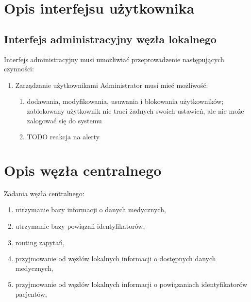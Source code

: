 \documentclass[a4paper]{report}
\begin{document}
\section{Opis interfejsu użytkownika}


\subsection{Interfejs administracyjny węzła lokalnego}

Interfejs administracyjny musi umożliwiać przeprowadzenie następujących czynności:
\begin{enumerate}
  \item Zarządzanie użytkownikami
        Administrator musi mieć możliwość:
        \begin{enumerate}
          \item dodawania, modyfikowania, usuwania i blokowania użytkowników; zablokowany użytkownik nie traci
          żadnych swoich ustawień, ale nie może zalogować się do systemu
          \item TODO reakcja na alerty
        \end{enumerate}

  
\end{enumerate}


\section{Opis węzła centralnego}
Zadania węzła centralnego:
\begin{enumerate}
\item utrzymanie bazy informacji o danych medycznych,
\item utrzymanie bazy powiązań identyfikatorów,
\item routing zapytań,
\item przyjmowanie od węzłów lokalnych informacji o dostępnych danych medycznych,
\item przyjmowanie od węzłów lokalnych informacji o powiązaniach identyfikatorów pacjentów,
\end{enumerate}
\end{document}
